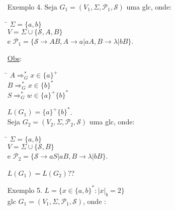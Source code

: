 \documentclass{article}
\newcommand{\gram}[1]{G_{#1} = (V_{#1},\Sigma,\mathcal{P}_{#1},\mathcal{S})}
\begin{document}
    \begin{enumerate}
        \item[Exemplo 4.] Seja $\gram{1}$ uma glc, onde:
            \begin{tabbing}
                \hspace{0.5cm}  \= $ \Sigma = \{a,b\} $\\
                                \> $ V = \Sigma \cup \{\mathcal{S}, A, B \} $\\
                                \> e $ \mathcal{P}_1 = \{   \mathcal{S} \rightarrow AB,
                                                            A \rightarrow a | aA,
                                                            B \rightarrow \lambda|bB \} $.
            \end{tabbing}
            \underline{Obs}:
            \begin{tabbing}
                \hspace{0.5cm}  \= $ A \Rightarrow_G^* x \in \{a\}^+ $ \\
                                \> $ B \Rightarrow_G^* x \in \{b\}^* $ \\
                                \> $ S \Rightarrow_G^* w \in \{a\}^+\{b\}^* $
            \end{tabbing}
            $ L(G_1) = \{a\}^+\{b\}^* $.\\
            Seja $\gram{2}$ uma glc, onde:
            \begin{tabbing}
                \hspace{0.5cm}  \= $ \Sigma = \{a,b\} $\\
                                \> $ V = \Sigma \cup \{\mathcal{S}, B \} $\\
                                \> e $ \mathcal{P}_2 = \{   \mathcal{S} \rightarrow aS | aB,
                                                            B \rightarrow \lambda|bB \} $.
            \end{tabbing}
            $ L(G_1) = L(G_2) $??
        \item[Exemplo 5.] $ L = \{ x \in \{a,b\}^* : |x|_b = 2 \} $ \\
            glc $ \gram{1} $, onde :
\end{enumerate}
\end{document}

